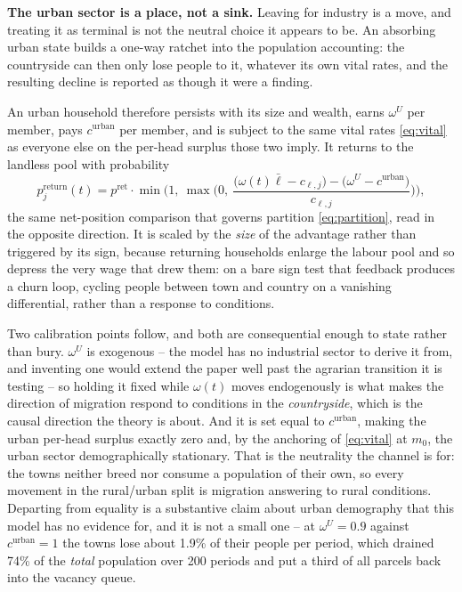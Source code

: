 \documentclass[11pt,english]{article}
\begin{document}
\textbf{The urban sector is a place, not a sink.} Leaving for industry is a move, and treating it as terminal is not the neutral choice it appears to be. An absorbing urban state builds a one-way ratchet into the population accounting: the countryside can then only lose people to it, whatever its own vital rates, and the resulting decline is reported as though it were a finding.

An urban household therefore persists with its size and wealth, earns $\omega^{U}$ per member, pays $c^{\text{urban}}$ per member, and is subject to the same vital rates \eqref{eq:vital} as everyone else on the per-head surplus those two imply. It returns to the landless pool with probability
\begin{equation}
p_j^{\text{return}}(t) = p^{\text{ret}}\cdot\min\!\Big(1,\ \max\Big(0,\ \frac{\big(\omega(t)\bar\ell - c_{\ell,j}\big) - \big(\omega^{U} - c^{\text{urban}}\big)}{c_{\ell,j}}\Big)\Big),
\label{eq:return}
\end{equation}
the same net-position comparison that governs partition \eqref{eq:partition}, read in the opposite direction. It is scaled by the \emph{size} of the advantage rather than triggered by its sign, because returning households enlarge the labour pool and so depress the very wage that drew them: on a bare sign test that feedback produces a churn loop, cycling people between town and country on a vanishing differential, rather than a response to conditions.

Two calibration points follow, and both are consequential enough to state rather than bury. $\omega^{U}$ is exogenous -- the model has no industrial sector to derive it from, and inventing one would extend the paper well past the agrarian transition it is testing -- so holding it fixed while $\omega(t)$ moves endogenously is what makes the direction of migration respond to conditions in the \emph{countryside}, which is the causal direction the theory is about. And it is set equal to $c^{\text{urban}}$, making the urban per-head surplus exactly zero and, by the anchoring of \eqref{eq:vital} at $m_0$, the urban sector demographically stationary. That is the neutrality the channel is for: the towns neither breed nor consume a population of their own, so every movement in the rural/urban split is migration answering to rural conditions. Departing from equality is a substantive claim about urban demography that this model has no evidence for, and it is not a small one -- at $\omega^{U}=0.9$ against $c^{\text{urban}}=1$ the towns lose about 1.9\% of their people per period, which drained 74\% of the \emph{total} population over 200 periods and put a third of all parcels back into the vacancy queue.
\end{document}
